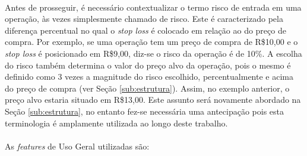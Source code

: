 \paragraph{} Antes de prosseguir, é necessário contextualizar o termo risco de entrada em uma operação, às vezes simplesmente chamado de risco. Este é caracterizado pela diferença percentual no qual o \textit{stop loss} é colocado em relação ao do preço de compra. Por exemplo, se uma operação tem um preço de compra de R\$10,00 e o \textit{stop loss} é posicionado em R\$9,00, diz-se o risco da operação é de 10\%. A escolha do risco também determina o valor do preço alvo da operação, pois o mesmo é definido como 3 vezes a magnitude do risco escolhido, percentualmente e acima do preço de compra (ver Seção \ref{sub:estrutura}). Assim, no exemplo anterior, o preço alvo estaria situado em R\$13,00. Este assunto será novamente abordado na Seção \ref{sub:estrutura}, no entanto fez-se necessária uma antecipação pois esta terminologia é amplamente utilizada ao longo deste trabalho.

\paragraph{} As \textit{features} de Uso Geral utilizadas são:

